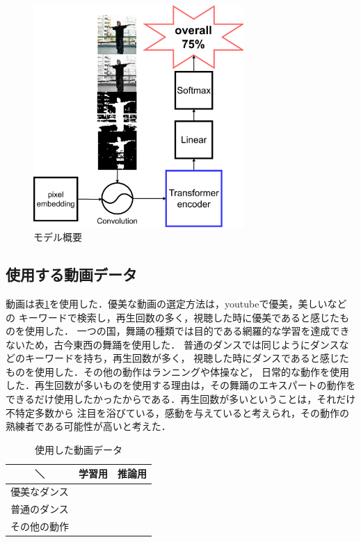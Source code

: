 \begin{figure}[t]
  \begin{center}
    \includegraphics[width=80mm]{images/chart/easy_chart.pdf}
  \end{center}
  \caption{モデル概要}
  \label{easy_chart}
\end{figure}

\subsection{使用する動画データ}
動画は表\ref{video_data}を使用した．優美な動画の選定方法は，youtubeで優美，美しいなどの
キーワードで検索し，再生回数の多く，視聴した時に優美であると感じたものを使用した．
一つの国，舞踊の種類では目的である網羅的な学習を達成できないため，古今東西の舞踊を使用した．
普通のダンスでは同じようにダンスなどのキーワードを持ち，再生回数が多く，
視聴した時にダンスであると感じたものを使用した．その他の動作はランニングや体操など，
日常的な動作を使用した．再生回数が多いものを使用する理由は，その舞踊のエキスパートの動作を
できるだけ使用したかったからである．再生回数が多いということは，それだけ不特定多数から
注目を浴びている，感動を与えていると考えられ，その動作の熟練者である可能性が高いと考えた．

\begin{table}[b]
  \begin{center}
    \begin{tabular}{|c|c|c|} \hline
      ＼ & 学習用 & 推論用 \\ \hline
      優美なダンス
        & \cite{jpn}\cite{china}\cite{ballet}\cite{thai}\cite{jpn2}
        & \cite{balletgroup}\cite{jpngroup}\cite{chinagroup}\cite{belly}
      \\ \hline
      普通のダンス
        & \cite{ariana}\cite{kadokawa}\cite{bts}\cite{manolo}\cite{aito}
        & \cite{btsgroup}\cite{arashi}\cite{hyoga}\cite{legit}
      \\ \hline
      その他の動作
        & \cite{radio}\cite{posing}\cite{boxing}\cite{running}\cite{shinkokyu}\cite{leaves}
        & \cite{radio2}
      \\ \hline
    \end{tabular}
  \end{center}
  \caption{使用した動画データ}
  \label{video_data}
\end{table}


